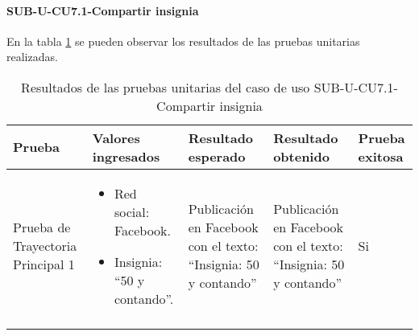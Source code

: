 \paragraph{SUB-U-CU7.1-Compartir insignia}\label{SUB-U-CU7.1:Pruebas}
En la tabla \ref{pruebas_unitarias_sub-u-cu7.1} se pueden observar los resultados de las pruebas unitarias realizadas.
\begin{longtable}{|M{2cm}| M{4.5cm}|M{3cm}|M{3cm}|M{1.5cm}|}
	\hline
	\textbf{Prueba} & \textbf{Valores ingresados} & \textbf{Resultado esperado} & \textbf{Resultado obtenido} & \textbf{Prueba exitosa} \\ \hline
	Prueba de Trayectoria Principal 1 & 
	\begin{itemize}
		\item Red social: Facebook.
		\item Insignia: ``50 y contando''.
	\end{itemize}
	& 
	Publicación en Facebook con el texto: ``Insignia: 50 y contando''
	&
	Publicación en Facebook con el texto: ``Insignia: 50 y contando''
	& Si \\ \hline

	\caption{Resultados de las pruebas unitarias del caso de uso SUB-U-CU7.1-Compartir insignia}
	\label{pruebas_unitarias_sub-u-cu7.1}
\end{longtable}